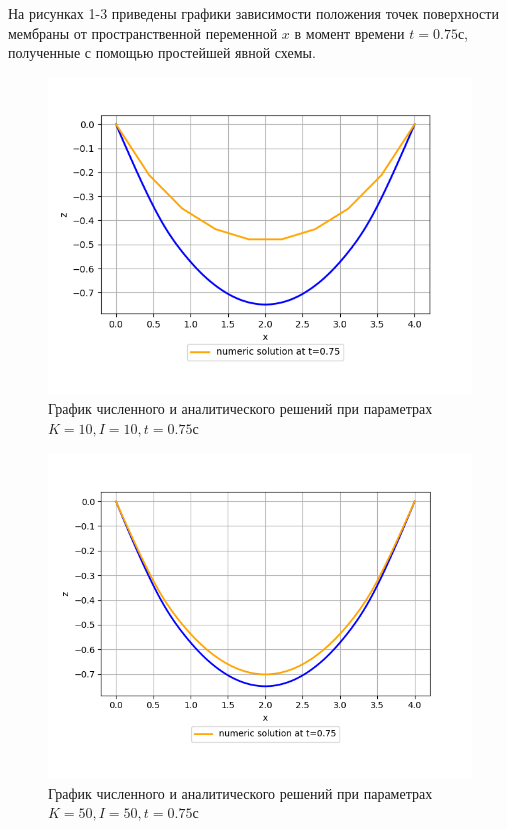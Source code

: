 {{		 На рисунках 1-3 приведены графики зависимости положения точек поверхности мембраны от пространственной переменной $x$ в момент времени $t = 0.75с$, полученные с помощью простейшей явной схемы.
	
		 \begin{figure}[H]
		  \begin{center}
			\includegraphics[width=0.7\pagewidth]{plots/075_10_10}
	\caption{График численного и аналитического решений при параметрах $K=10, I=10, t = 0.75с$}
		 \end{center}
	\label{some_pic}
\end{figure}

 \begin{figure}[H]
   \begin{center}
			\includegraphics[width=0.6\pagewidth, height=0.33\pageheight]{plots/075_50_50}
	\caption{ График численного и аналитического решений при параметрах $K=50, I=50, t = 0.75с$}
	 \end{center}
	\label{some_pic}
\end{figure}

}}
